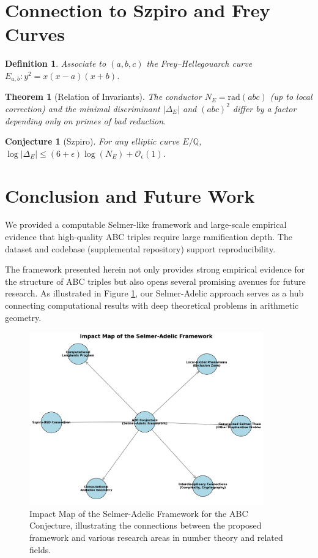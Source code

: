 \documentclass[11pt,a4paper]{article}
\newtheorem{definition}{Definition}[section]
\newtheorem{conjecture}{Conjecture}[section]
\newtheorem{theorem}{Theorem}[section]
\newcommand{\Q}{\mathbb{Q}}
\newcommand{\rad}{\mathrm{rad}}
\begin{document}
\section{Connection to Szpiro and Frey Curves}
\begin{definition}
Associate to $(a,b,c)$ the Frey--Hellegouarch curve $E_{a,b}: y^2 = x(x-a)(x+b)$.
\end{definition}
\begin{theorem}[Relation of Invariants]
The conductor $N_E=\rad(abc)$ (up to local correction) and the minimal discriminant $|\Delta_E|$ and $(abc)^2$ differ by a factor depending only on primes of bad reduction.
\end{theorem}
\begin{conjecture}[Szpiro]
For any elliptic curve $E/\Q$, $\log|\Delta_E| \le (6+\epsilon)\log(N_E) + \mathcal{O}_\epsilon(1)$.
\end{conjecture}

\section{Conclusion and Future Work}

We provided a computable Selmer-like framework and large-scale empirical evidence that high-quality ABC triples require large ramification depth. The dataset and codebase (supplemental repository) support reproducibility.

The framework presented herein not only provides strong empirical evidence for the structure of ABC triples but also opens several promising avenues for future research. As illustrated in Figure \ref{fig:impact_map}, our Selmer-Adelic approach serves as a hub connecting computational results with deep theoretical problems in arithmetic geometry.

\begin{figure}[h!]
    \centering
    \includegraphics[width=0.9\textwidth]{../figures/impact_map.png}
    \caption{Impact Map of the Selmer-Adelic Framework for the ABC Conjecture, illustrating the connections between the proposed framework and various research areas in number theory and related fields.}
    \label{fig:impact_map}
\end{figure}
\end{document}
